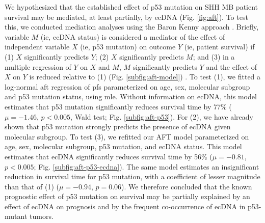 \par We hypothesized that the established effect of p53 mutation on SHH MB patient survival \cite{zhukova_2013} may be mediated, at least partially, by ecDNA (Fig. \ref{fig:aft}). To test this, we conducted mediation analyses using the Baron Kenny approach \cite{baron-kenny_1986}. Briefly, variable $M$ (ie, ecDNA status) is considered a mediator of the effect of independent variable $X$ (ie, p53 mutation) on outcome $Y$ (ie, patient survival) if (1) $X$ significantly predicts $Y$; (2) $X$ significantly predicts $M$; and (3) in a multiple regression of $Y$ on $X$ and $M$, $M$ significantly predicts $Y$ and the effect of $X$ on $Y$ is reduced relative to (1) (Fig. \ref{subfig:aft-model}) \cite{jung_2012}. To test (1), we fitted a log-normal \gls{aft} regression of \gls{pfs} parameterized on age, sex, molecular subgroup and p53 mutation status, using \gls{mle}. Without information on ecDNA, this model estimates that p53 mutation significantly reduces survival time by 77\% ($\mu = -1.46$, $p < 0.005$, Wald test; Fig. \ref{subfig:aft-p53}). For (2), we have already shown that p53 mutation strongly predicts the presence of ecDNA given molecular subgroup. To test (3), we refitted our AFT model parameterized on age, sex, molecular subgroup, p53 mutation, and ecDNA status. This model estimates that ecDNA significantly reduces survival time by 56\% ($\mu = -0.81$, $p < 0.005$; Fig. \ref{subfig:aft-p53-ecdna}). The same model estimates an insignificant reduction in survival time for p53 mutation, with a coefficient of lesser magnitude than that of (1) ($\mu = -0.94$, $p = 0.06$). We therefore concluded that the known prognostic effect of p53 mutation on survival may be partially  explained by an effect of ecDNA on prognosis and by the frequent co-occurrence of ecDNA in p53-mutant tumors.

